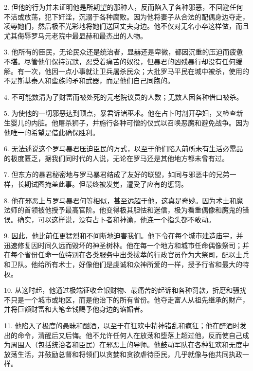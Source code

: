 2. 但他的行为并未证明他是所期望的那种人，反而陷入了各种邪恶，不回避任何不洁或放荡，犯下奸淫，沉溺于各种腐败。因为他将妻子从合法的配偶身边夺走，凌辱她们，然后极不光彩地将她们送回丈夫身边。他不仅对无名小卒这样做，而且尤其侮辱罗马元老院中最显赫和最杰出的人物。\par

3. 他所有的臣民，无论民众还是统治者，显赫还是卑微，都因沉重的压迫而疲惫不堪。尽管他们保持沉默，忍受着痛苦的奴役，但暴君的凶残暴行却没有任何缓解。有一次，他因一点小事就让卫兵屠杀民众；大批罗马平民在城中被杀，使用的不是斯基泰人和蛮族的矛和武器，而是他们自己同胞的。\par

4. 不可能数清为了财富而被处死的元老院议员的人数；无数人因各种借口被杀。\par

5. 为使他的一切邪恶达到顶点，暴君诉诸巫术。他在占卜时剖开孕妇，又检查新生婴儿的内脏。他屠杀狮子，并施行各种可憎的仪式以召唤恶魔和避免战争。因为他唯一的希望是借此确保胜利。\par

6. 无法述说这个罗马暴君压迫臣民的方式，以至于他们陷入前所未有生活必需品的极度匮乏，据我们同时代的人说，无论在罗马还是其他地方都未曾有过。\par

7. 但东方的暴君秘密地与罗马暴君结成了友好的联盟，如同与邪恶中的兄弟一样，长期试图掩盖此事。但最终被发觉，遭受了应有的惩罚。\par

8. 他在邪恶上与罗马暴君何等相似，甚至远超于他，这真是奇妙。因为术士和魔法师的首领被他授予最高官阶。他变得极其胆怯和迷信，极为看重偶像和魔鬼的错误。确实，可以这样说，没有占卜者和神谕，他连一个指头都不敢动。\par

9. 因此，他比前任更猛烈和不间断地迫害我们。他下令在每个城市建造庙宇，并迅速修复因时间久远而毁坏的神圣树林。他在每一个地方和城市任命偶像祭司；并在每个省份任命一位特别在各类服务中出类拔萃的行政官员作为大祭司，配以士兵和卫队。他给所有术士，好像他们是虔诚和众神所爱的一样，授予行省和最大的特权。\par

10. 从这时起，他通过极端征收金银财物、最痛苦的起诉和各种罚款，折磨和骚扰不只是一个城市或地区，而是他治下的所有省份。他夺走富人从祖先继承的财产，并将巨额财富和大笔金钱赐予他身边的谄媚者。\par

11. 他陷入了极度的愚昧和酗酒，以至于在狂欢中精神错乱和疯狂；他在醉酒时发出的命令，清醒后又后悔。他不允许任何人在放荡和堕落上超过他，反而使自己成为周围人（包括统治者和臣民）在邪恶上的导师。他鼓动军队在各种狂欢和无度中放荡生活，并鼓励总督和将领们以贪婪和贪欲虐待臣民，几乎就像与他共同执政一样。\par

